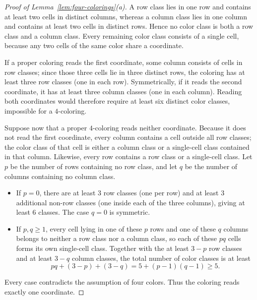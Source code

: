 \begin{proof}[Proof of Lemma~\ref{lem:four-colorings}\textup{(a)}]
A row class lies in one row and contains at least two cells in distinct columns, whereas a column class lies in one column and contains at least two cells in distinct rows. Hence no color class is both a row class and a column class. Every remaining color class consists of a single cell, because any two cells of the same color share a coordinate.

If a proper coloring reads the first coordinate, some column consists of cells in row classes; since those three cells lie in three distinct rows, the coloring has at least three row classes (one in each row). Symmetrically, if it reads the second coordinate, it has at least three column classes (one in each column). Reading both coordinates would therefore require at least six distinct color classes, impossible for a $4$-coloring.

Suppose now that a proper $4$-coloring reads neither coordinate. Because it does not read the first coordinate, every column contains a cell outside all row classes; the color class of that cell is either a column class or a single-cell class contained in that column. Likewise, every row contains a row class or a single-cell class. Let $p$ be the number of rows containing no row class, and let $q$ be the number of columns containing no column class.
\begin{itemize}
\item If $p=0$, there are at least $3$ row classes (one per row) and at least $3$ additional non-row classes (one inside each of the three columns), giving at least $6$ classes. The case $q=0$ is symmetric.
\item If $p,q\ge1$, every cell lying in one of these $p$ rows and one of these $q$ columns belongs to neither a row class nor a column class, so each of these $pq$ cells forms its own single-cell class. Together with the at least $3-p$ row classes and at least $3-q$ column classes, the total number of color classes is at least
\[
 pq+(3-p)+(3-q)=5+(p-1)(q-1)\ge5.
\]
\end{itemize}
Every case contradicts the assumption of four colors. Thus the coloring reads exactly one coordinate.
\end{proof}

